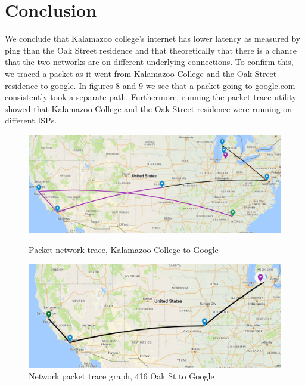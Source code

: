 \documentclass{article}
\begin{document}
\section{Conclusion}
We conclude that Kalamazoo college's internet has lower latency as measured by ping than the Oak Street residence and that theoretically that there is a chance that the two networks are on different underlying connections. To confirm this, we traced a packet as it went from Kalamazoo College and the Oak Street residence to google. In figures 8 and 9 we see that a packet going to google.com consistently took a separate path. Furthermore, running the packet trace utility showed that Kalamazoo College and the Oak Street residence were running on different ISPs.
\begin{figure}
    \centering
    \begin{minipage}{.45\textwidth}
        \centering
        \includegraphics[width=\linewidth, height=0.15\textheight]{NetworkMapHome2.png}
        \caption{Packet network trace, Kalamazoo College to Google}
        \label{fig:prob1_6_2}
    \end{minipage}%
    \hspace{0.05\linewidth}
    \begin{minipage}{0.45\textwidth}
        \centering
        \includegraphics[width=\linewidth, height=0.15\textheight]{NetworkMapSchool.png}
        \caption{Network packet trace graph, 416 Oak St to Google}
        \label{fig:prob1_6_1}
    \end{minipage}
\end{figure}
\end{document}
